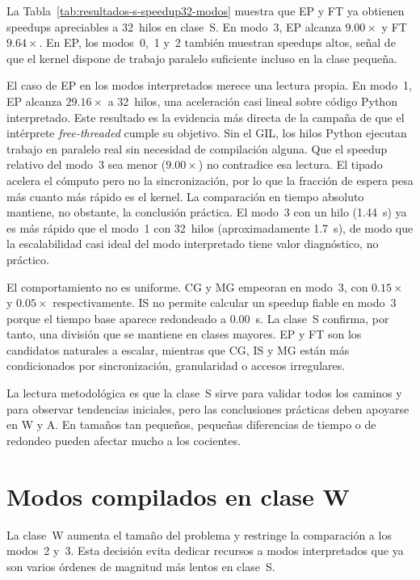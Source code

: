 La Tabla~\ref{tab:resultados-s-speedup32-modos} muestra que EP y FT ya obtienen
speedups apreciables a 32~hilos en clase~S. En modo~3, EP alcanza
$9.00\times$ y FT $9.64\times$. En EP, los modos~0,~1 y~2 también muestran
speedups altos, señal de que el kernel dispone de trabajo paralelo suficiente
incluso en la clase pequeña.

El caso de EP en los modos interpretados merece una lectura propia. En modo~1,
EP alcanza $29.16\times$ a 32~hilos, una aceleración casi lineal sobre código
Python interpretado. Este resultado es la evidencia más directa de la campaña
de que el intérprete \emph{free-threaded} cumple su objetivo. Sin el GIL, los
hilos Python ejecutan trabajo en paralelo real sin necesidad de compilación
alguna. Que el speedup relativo del modo~3 sea menor ($9.00\times$) no
contradice esa lectura. El tipado acelera el cómputo pero no la sincronización,
por lo que la fracción de espera pesa más cuanto más rápido es el kernel. La
comparación en tiempo absoluto mantiene, no obstante, la conclusión práctica.
El modo~3 con un hilo (1.44~s) ya es más rápido que el modo~1 con 32~hilos
(aproximadamente 1.7~s), de modo que la escalabilidad casi ideal del modo
interpretado tiene valor diagnóstico, no práctico.

El comportamiento no es uniforme. CG y MG empeoran en modo~3, con
$0.15\times$ y $0.05\times$ respectivamente. IS no permite calcular un speedup
fiable en modo~3 porque el tiempo base aparece redondeado a 0.00~s. La clase~S
confirma, por tanto, una división que se mantiene en clases mayores. EP y FT
son los candidatos naturales a escalar, mientras que CG, IS y MG están más
condicionados por sincronización, granularidad o accesos irregulares.

La lectura metodológica es que la clase~S sirve para validar todos los caminos y
para observar tendencias iniciales, pero las conclusiones prácticas deben
apoyarse en W y A. En tamaños tan pequeños, pequeñas diferencias de tiempo o de
redondeo pueden afectar mucho a los cocientes.


\section{Modos compilados en clase W}
\label{sec:resultados-clase-w}

La clase~W aumenta el tamaño del problema y restringe la comparación a los
modos~2 y~3. Esta decisión evita dedicar recursos a modos interpretados que ya
son varios órdenes de magnitud más lentos en clase~S.

